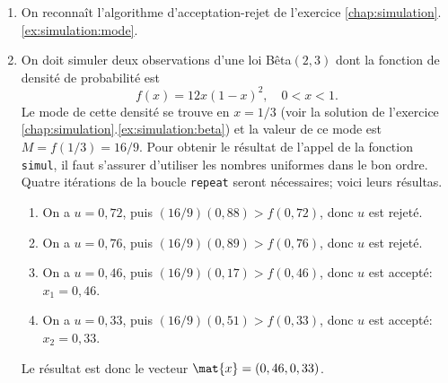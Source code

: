 \begin{exercice}
\begin{rep}
\begin{enumerate}[a)]
    \end{enumerate}
  \end{rep}
  \begin{sol}
    \begin{enumerate}
    \item On reconnaît l'algorithme d'acceptation-rejet de l'exercice
      \ref{chap:simulation}.\ref{ex:simulation:mode}.
    \item On doit simuler deux observations d'une loi Bêta$(2, 3)$
      dont la fonction de densité de probabilité est
      \begin{displaymath}
        f(x) = 12 x (1 - x)^2, \quad 0 < x < 1.
      \end{displaymath}
      Le mode de cette densité se trouve en $x = 1/3$ (voir la
      solution de l'exercice
      \ref{chap:simulation}.\ref{ex:simulation:beta}) et la valeur de
      ce mode est $M = f(1/3) = 16/9$. Pour obtenir le résultat de
      l'appel de la fonction \texttt{simul}, il faut s'assurer
      d'utiliser les nombres uniformes dans le bon ordre. Quatre
      itérations de la boucle \texttt{repeat} seront nécessaires;
      voici leurs résultas.
      \begin{enumerate}[1.]
      \item On a $u = 0,72$, puis $(16/9) (0,88) > f(0,72)$, donc $u$
        est rejeté.
      \item On a $u = 0,76$, puis $(16/9) (0,89) > f(0,76)$, donc $u$
        est rejeté.
      \item On a $u = 0,46$, puis $(16/9) (0,17) > f(0,46)$, donc $u$
        est accepté: $x_1 = 0,46$.
      \item On a $u = 0,33$, puis $(16/9) (0,51) > f(0,33)$, donc $u$
        est accepté: $x_2 = 0,33$.
      \end{enumerate}
      Le résultat est donc le vecteur $\mat{x} = (0,46, 0,33)$.
    \end{enumerate}
  \end{sol}
\end{exercice}


